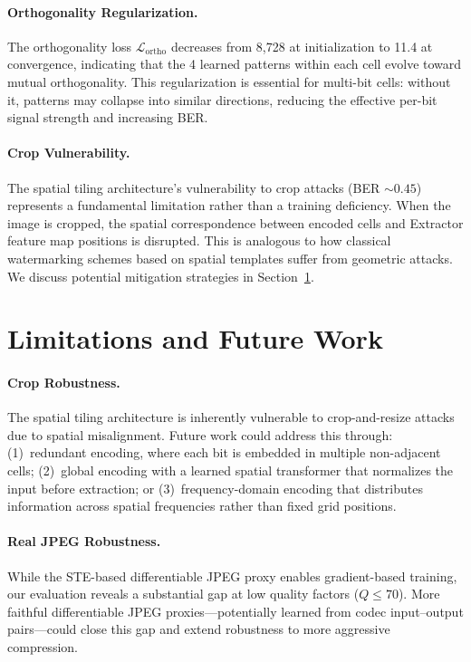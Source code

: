\documentclass[10pt, twocolumn]{article}
\newcommand{\Lcal}{\mathcal{L}}
\begin{document}
\paragraph{Orthogonality Regularization.}
The orthogonality loss $\Lcal_\text{ortho}$ decreases from 8{,}728 at initialization to 11.4 at convergence, indicating that the 4 learned patterns within each cell evolve toward mutual orthogonality.
This regularization is essential for multi-bit cells: without it, patterns may collapse into similar directions, reducing the effective per-bit signal strength and increasing BER.

\paragraph{Crop Vulnerability.}
The spatial tiling architecture's vulnerability to crop attacks (BER $\sim 0.45$) represents a fundamental limitation rather than a training deficiency.
When the image is cropped, the spatial correspondence between encoded cells and Extractor feature map positions is disrupted.
This is analogous to how classical watermarking schemes based on spatial templates suffer from geometric attacks.
We discuss potential mitigation strategies in Section~\ref{sec:limitations}.


\section{Limitations and Future Work}
\label{sec:limitations}

\paragraph{Crop Robustness.}
The spatial tiling architecture is inherently vulnerable to crop-and-resize attacks due to spatial misalignment.
Future work could address this through: (1)~redundant encoding, where each bit is embedded in multiple non-adjacent cells; (2)~global encoding with a learned spatial transformer that normalizes the input before extraction; or (3)~frequency-domain encoding that distributes information across spatial frequencies rather than fixed grid positions.

\paragraph{Real JPEG Robustness.}
While the STE-based differentiable JPEG proxy enables gradient-based training, our evaluation reveals a substantial gap at low quality factors ($Q \leq 70$).
More faithful differentiable JPEG proxies---potentially learned from codec input--output pairs---could close this gap and extend robustness to more aggressive compression.
\end{document}
